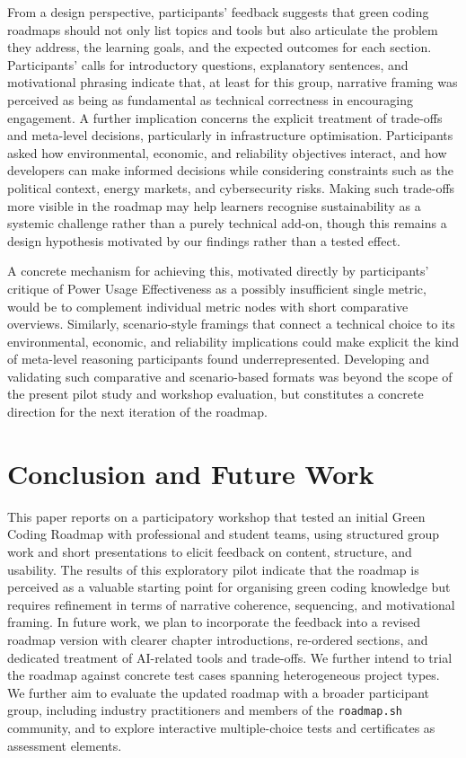 \documentclass[english]{lni}
\begin{document}
From a design perspective, participants' feedback suggests that green coding roadmaps should not only list topics and tools but also articulate the problem they address, the learning goals, and the expected outcomes for each section. Participants' calls for introductory questions, explanatory sentences, and motivational phrasing indicate that, at least for this group, narrative framing was perceived as being as fundamental as technical correctness in encouraging engagement. 
A further implication concerns the explicit treatment of trade-offs and meta-level decisions, particularly in infrastructure optimisation. Participants asked how environmental, economic, and reliability objectives interact, and how developers can make informed decisions while considering constraints such as the political context, energy markets, and cybersecurity risks. Making such trade-offs more visible in the roadmap may help learners recognise sustainability as a systemic challenge rather than a purely technical add-on, though this remains a design hypothesis motivated by our findings rather than a tested effect.

A concrete mechanism for achieving this, motivated directly by participants' critique of Power Usage Effectiveness as a possibly insufficient single metric, would be to complement individual metric nodes with short comparative overviews. Similarly, scenario-style framings that connect a technical choice to its environmental, economic, and reliability implications could make explicit the kind of meta-level reasoning participants found underrepresented. Developing and validating such comparative and scenario-based formats was beyond the scope of the present pilot study and workshop evaluation, but constitutes a concrete direction for the next iteration of the roadmap.

\section{Conclusion and Future Work}
This paper reports on a participatory workshop that tested an initial Green Coding Roadmap with professional and student teams, using structured group work and short presentations to elicit feedback on content, structure, and usability. The results of this exploratory pilot indicate that the roadmap is perceived as a valuable starting point for organising green coding knowledge but requires refinement in terms of narrative coherence, sequencing, and motivational framing.
In future work, we plan to incorporate the feedback into a revised roadmap version with clearer chapter introductions, re-ordered sections, and dedicated treatment of AI-related tools and trade-offs. We further intend to trial the roadmap against concrete test cases spanning heterogeneous project types. We further aim to evaluate the updated roadmap with a broader participant group, including industry practitioners and members of the \texttt{roadmap.sh} community, and to explore interactive multiple-choice tests and certificates as assessment elements. 
\end{document}
